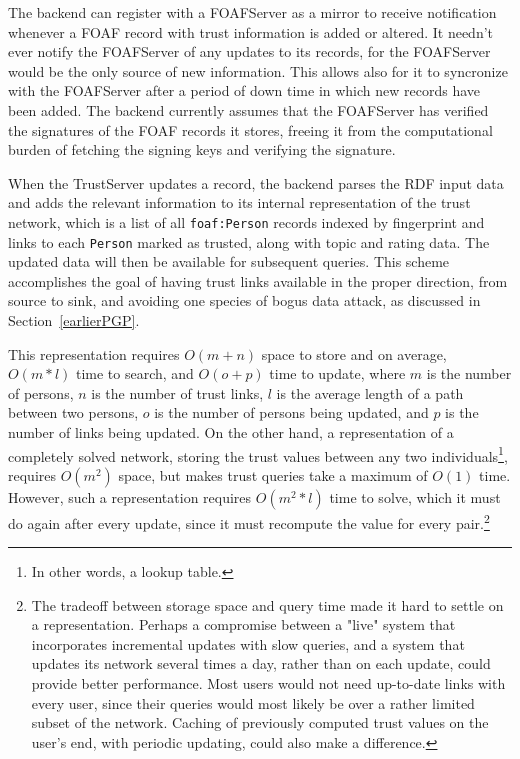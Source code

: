 \documentclass{acm_proc_article-sp}
\begin{document}
The backend can register with a FOAFServer as a mirror to receive notification whenever a FOAF record with trust information is added or altered.  It needn't ever notify the FOAFServer of any updates to its records, for the FOAFServer would be the only source of new information.  This allows also for it to syncronize with the FOAFServer after a period of down time in which new records have been added.  The backend currently assumes that the FOAFServer has verified the signatures of the FOAF records it stores, freeing it from the computational burden of fetching the signing keys and verifying the signature.

When the TrustServer updates a record, the backend parses the RDF input data and adds the relevant information to its internal representation of the trust network, which is a list of all \texttt{foaf:Person} records indexed by fingerprint and links to each \texttt{Person} marked as trusted, along with topic and rating data.  The updated data will then be available for subsequent queries.  This scheme accomplishes the goal of having trust links available in the proper direction, from source to sink, and avoiding one species of bogus data attack, as discussed in Section~\ref{earlierPGP}.  

This representation requires $O(m+n)$ space to store and on average, $O(m*l)$ time to search, and $O(o+p)$ time to update, where $m$ is the number of persons, $n$ is the number of trust links, $l$ is the average length of a path between two persons, $o$ is the number of persons being updated, and $p$ is the number of links being updated.  On the other hand, a representation of a completely solved network, storing the trust values between any two individuals\footnote{In other words, a lookup table.}, requires $O(m^2)$ space, but makes trust queries take a maximum of $O(1)$ time.  However, such a representation requires $O(m^2*l)$ time to solve, which it must do again after every update, since it must recompute the value for every pair.\footnote{The tradeoff between storage space and query time made it hard to settle on a representation.  Perhaps a compromise between a "live" system that incorporates incremental updates with slow queries, and a system that updates its network several times a day, rather than on each update, could provide better performance.  Most users would not need up-to-date links with every user, since their queries would most likely be over a rather limited subset of the network.  Caching of previously computed trust values on the user's end, with periodic updating, could also make a difference.}
\end{document}
